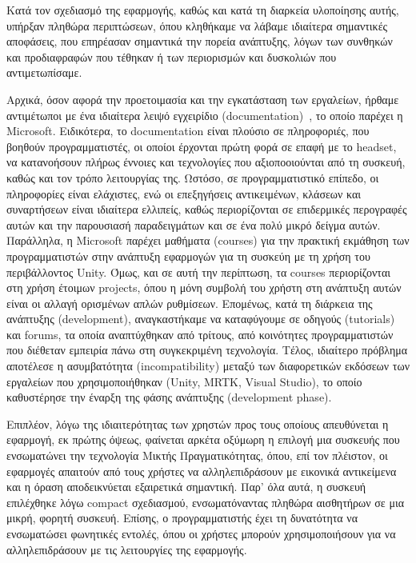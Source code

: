 Κατά τον σχεδιασμό της εφαρμογής, καθώς και κατά τη διαρκεία υλοποίησης αυτής, υπήρξαν πληθώρα περιπτώσεων, όπου κληθήκαμε να λάβαμε ιδιαίτερα σημαντικές αποφάσεις, που επηρέασαν σημαντικά την πορεία ανάπτυξης, λόγων των συνθηκών και προδιαφραφών που τέθηκαν ή των περιορισμών και δυσκολιών που αντιμετωπίσαμε.

Αρχικά, όσον αφορά την προετοιμασία και την εγκατάσταση των εργαλείων, ήρθαμε αντιμέτωποι με ένα ιδιαίτερα λειψό εγχειρίδιο (documentation)~\cite{hferrone_mixed}, το οποίο παρέχει η Microsoft.
Ειδικότερα, το documentation είναι πλούσιο σε πληροφοριές, που βοηθούν προγραμματιστές, οι οποίοι έρχονται πρώτη φορά σε επαφή με το headset, να κατανοήσουν πλήρως έννοιες και τεχνολογίες που αξιοποοιούνται από τη συσκευή, καθώς και τον τρόπο λειτουργίας της. Ωστόσο, σε προγραμματιστικό επίπεδο, οι πληροφορίες είναι ελάχιστες, ενώ οι επεξηγήσεις αντικειμένων, κλάσεων και συναρτήσεων είναι ιδιαίτερα ελλιπείς, καθώς περιορίζονται σε επιδερμικές περογραφές αυτών και την παρουσιασή παραδειγμάτων και σε ένα πολύ μικρό δείγμα αυτών.
Παράλληλα, η Microsoft παρέχει μαθήματα (courses) για την πρακτική εκμάθηση των προγραμματιστών στην ανάπτυξη εφαρμογών για τη συσκεύη με τη χρήση του περιβάλλοντος Unity. Όμως, και σε αυτή την περίπτωση, τα courses περιορίζονται στη χρήση έτοιμων projects, όπου η μόνη συμβολή του χρήστη στη ανάπτυξη αυτών είναι οι αλλαγή ορισμένων απλών ρυθμίσεων. Επομένως, κατά τη διάρκεια της ανάπτυξης (development), αναγκαστήκαμε να καταφύγουμε σε οδηγούς (tutorials) και forums, τα οποία αναπτύχθηκαν από τρίτους, από κοινότητες προγραμματιστών που διέθεταν εμπειρία πάνω στη συγκεκριμένη τεχνολογία.
Τέλος, ιδιαίτερο πρόβλημα αποτέλεσε η ασυμβατότητα (incompatibility) μεταξύ των διαφορετικών εκδόσεων των εργαλείων που χρησιμοποιήθηκαν (Unity, MRTK, Visual Studio), το οποίο καθυστέρησε την έναρξη της φάσης ανάπτυξης (development phase).

Επιπλέον, λόγω της ιδιαιτερότητας των χρηστών προς τους οποίους απευθύνεται η εφαρμογή, εκ πρώτης όψεως, φαίνεται αρκέτα οξύμωρη η επιλογή μια συσκευής που ενσωματώνει την τεχνολογία Μικτής Πραγματικότητας, όπου, επί τον πλέιστον, οι εφαρμογές απαιτούν από τους χρήστες να αλληλεπιδράσουν με εικονικά αντικείμενα και η όραση αποδεικνύεται εξαιρετικά σημαντική. Παρ' όλα αυτά, η συσκευή επιλέχθηκε λόγω compact σχεδιασμού, ενσωματόναντας πληθώρα αισθητήρων σε μια μικρή, φορητή συσκευή. Επίσης, ο προγραμματιστής έχει τη δυνατότητα να ενσωματώσει φωνητικές εντολές, όπου οι χρήστες μπορούν χρησιμοποιήσουν για να αλληλεπιδράσουν με τις λειτουργίες της εφαρμογής.

